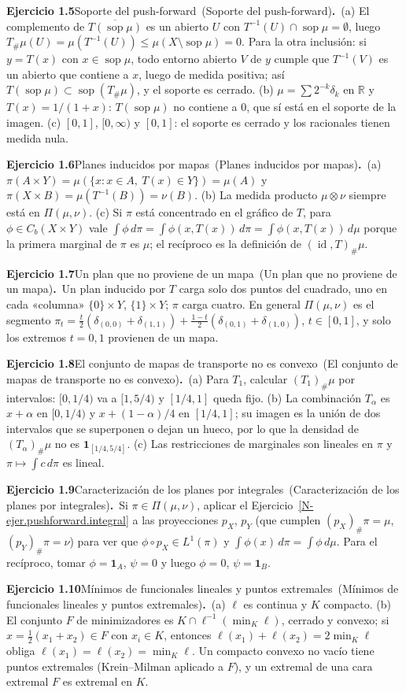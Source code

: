 \documentclass[11pt,a4paper]{amsart}
\newcommand{\id}{\operatorname{id}}
\def\sop{\operatorname {\mathrm{sop}}}
\newcommand{\R}{{\mathbb R}}
\newcommand{\I}{{\mathbf 1}}
\theoremstyle{remark}
\theoremstyle{definition}
\numberwithin{subsection}{section}
\numberwithin{equation}{section}
\newcommand{\ejlabel}[2]{\par\medskip\noindent\textbf{Ejercicio #1}\ifx\relax#2\relax\else\ (#2)\fi\textbf{.}\ }
\begin{document}
\ejlabel{1.5}{Soporte del push-forward}(a) El complemento de $\overline{T(\sop\mu)}$ es un abierto $U$ con $T^{-1}(U)\cap\sop\mu=\emptyset$, luego $T_\#\mu(U)=\mu(T^{-1}(U))\le\mu(X\setminus\sop\mu)=0$. Para la otra inclusión: si $y=T(x)$ con $x\in\sop\mu$, todo entorno abierto $V$ de $y$ cumple que $T^{-1}(V)$ es un abierto que contiene a $x$, luego de medida positiva; así $T(\sop\mu)\subset\sop(T_\#\mu)$, y el soporte es cerrado. (b) $\mu=\sum2^{-k}\delta_k$ en $\R$ y $T(x)=1/(1+x)$: $T(\sop\mu)$ no contiene a $0$, que sí está en el soporte de la imagen. (c) $[0,1]$, $[0,\infty)$ y $[0,1]$: el soporte es cerrado y los racionales tienen medida nula.

\ejlabel{1.6}{Planes inducidos por mapas}(a) $\pi(A\times Y)=\mu(\{x:x\in A,\ T(x)\in Y\})=\mu(A)$ y $\pi(X\times B)=\mu(T^{-1}(B))=\nu(B)$. (b) La medida producto $\mu\otimes\nu$ siempre está en $\Pi(\mu,\nu)$. (c) Si $\pi$ está concentrado en el gráfico de $T$, para $\phi\in C_b(X\times Y)$ vale $\int\phi\,d\pi=\int\phi(x,T(x))\,d\pi=\int\phi(x,T(x))\,d\mu$ porque la primera marginal de $\pi$ es $\mu$; el recíproco es la definición de $(\id,T)_\#\mu$.

\ejlabel{1.7}{Un plan que no proviene de un mapa}Un plan inducido por $T$ carga solo dos puntos del cuadrado, uno en cada «columna» $\{0\}\times Y$, $\{1\}\times Y$; $\pi$ carga cuatro. En general $\Pi(\mu,\nu)$ es el segmento $\pi_t=\frac t2(\delta_{(0,0)}+\delta_{(1,1)})+\frac{1-t}2(\delta_{(0,1)}+\delta_{(1,0)})$, $t\in[0,1]$, y solo los extremos $t=0,1$ provienen de un mapa.

\ejlabel{1.8}{El conjunto de mapas de transporte no es convexo}(a) Para $T_1$, calcular $(T_1)_\#\mu$ por intervalos: $[0,1/4)$ va a $[1,5/4)$ y $[1/4,1]$ queda fijo. (b) La combinación $T_\alpha$ es $x+\alpha$ en $[0,1/4)$ y $x+(1-\alpha)/4$ en $[1/4,1]$; su imagen es la unión de dos intervalos que se superponen o dejan un hueco, por lo que la densidad de $(T_\alpha)_\#\mu$ no es $\I_{[1/4,5/4]}$. (c) Las restricciones de marginales son lineales en $\pi$ y $\pi\mapsto\int c\,d\pi$ es lineal.

\ejlabel{1.9}{Caracterización de los planes por integrales}Si $\pi\in\Pi(\mu,\nu)$, aplicar el Ejercicio~\ref{N-ejer.pushforward.integral} a las proyecciones $p_X$, $p_Y$ (que cumplen $(p_X)_\#\pi=\mu$, $(p_Y)_\#\pi=\nu$) para ver que $\phi\circ p_X\in L^1(\pi)$ y $\int\phi(x)\,d\pi=\int\phi\,d\mu$. Para el recíproco, tomar $\phi=\I_A$, $\psi=0$ y luego $\phi=0$, $\psi=\I_B$.

\ejlabel{1.10}{Mínimos de funcionales lineales y puntos extremales}(a) $\ell$ es continua y $K$ compacto. (b) El conjunto $F$ de minimizadores es $K\cap\ell^{-1}(\min_K\ell)$, cerrado y convexo; si $x=\frac12(x_1+x_2)\in F$ con $x_i\in K$, entonces $\ell(x_1)+\ell(x_2)=2\min_K\ell$ obliga $\ell(x_1)=\ell(x_2)=\min_K\ell$. Un compacto convexo no vacío tiene puntos extremales (Krein--Milman aplicado a $F$), y un extremal de una cara extremal $F$ es extremal en $K$.
\end{document}
